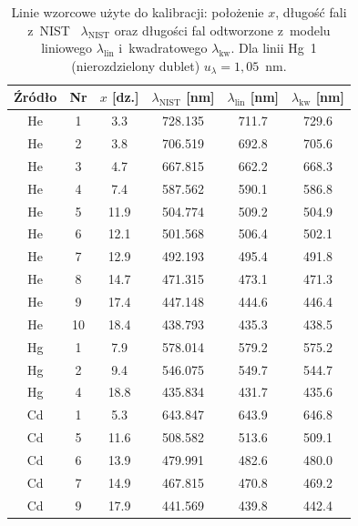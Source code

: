\documentclass[12pt, a4paper]{article}
\begin{document}
\begin{table}[H]
    \centering
    \caption{Linie wzorcowe użyte do kalibracji: położenie $x$, długość fali z~NIST~\cite{nist} $\lambda_\text{NIST}$ oraz długości fal odtworzone z~modelu liniowego $\lambda_\text{lin}$ i~kwadratowego $\lambda_\text{kw}$. Dla linii Hg~1 (nierozdzielony dublet) $u_\lambda = 1{,}05$~nm.}\label{tab:calibration}
    \begin{tabular}{c c S[table-format=2.1] S[table-format=3.3] S[table-format=3.1] S[table-format=3.1]}
        \toprule
        Źródło & Nr & {$x$ [dz.]} & {$\lambda_\text{NIST}$ [nm]} & {$\lambda_\text{lin}$ [nm]} & {$\lambda_\text{kw}$ [nm]} \\
        \midrule
        He & 1 & 3.3 & 728.135 & 711.7 & 729.6 \\
        He & 2 & 3.8 & 706.519 & 692.8 & 705.6 \\
        He & 3 & 4.7 & 667.815 & 662.2 & 668.3 \\
        He & 4 & 7.4 & 587.562 & 590.1 & 586.8 \\
        He & 5 & 11.9 & 504.774 & 509.2 & 504.9 \\
        He & 6 & 12.1 & 501.568 & 506.4 & 502.1 \\
        He & 7 & 12.9 & 492.193 & 495.4 & 491.8 \\
        He & 8 & 14.7 & 471.315 & 473.1 & 471.3 \\
        He & 9 & 17.4 & 447.148 & 444.6 & 446.4 \\
        He & 10 & 18.4 & 438.793 & 435.3 & 438.5 \\
        Hg & 1 & 7.9 & 578.014 & 579.2 & 575.2 \\
        Hg & 2 & 9.4 & 546.075 & 549.7 & 544.7 \\
        Hg & 4 & 18.8 & 435.834 & 431.7 & 435.6 \\
        Cd & 1 & 5.3 & 643.847 & 643.9 & 646.8 \\
        Cd & 5 & 11.6 & 508.582 & 513.6 & 509.1 \\
        Cd & 6 & 13.9 & 479.991 & 482.6 & 480.0 \\
        Cd & 7 & 14.9 & 467.815 & 470.8 & 469.2 \\
        Cd & 9 & 17.9 & 441.569 & 439.8 & 442.4 \\
        \bottomrule
    \end{tabular}
\end{table}
\end{document}
